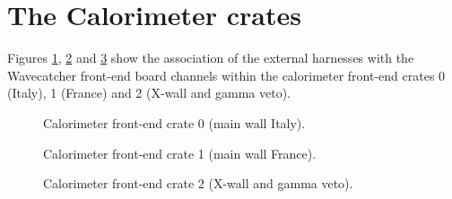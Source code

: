 
\clearpage
\section{The Calorimeter crates}

Figures  \ref{fig:calosignal:crates:0},  \ref{fig:calosignal:crates:1}
and \ref{fig:calosignal:crates:2} show the association of the external
harnesses  with the  Wavecatcher front-end  board channels  within the
calorimeter front-end crates  0 (Italy), 1 (France) and  2 (X-wall and
gamma veto).

\begin{figure}[h!]
  \begin{center}
    \scalebox{0.6}{}
  \end{center}
  \caption{Calorimeter front-end crate 0 (main wall Italy).}
  \label{fig:calosignal:crates:0}
\end{figure}

\begin{figure}[h!]
  \begin{center}
    \scalebox{0.6}{}
  \end{center}
  \caption{Calorimeter front-end crate 1 (main wall France).}
  \label{fig:calosignal:crates:1}
 
\end{figure}

\begin{figure}[h!]
  \begin{center}
    \scalebox{0.6}{}
  \end{center}
  \caption{Calorimeter front-end crate 2 (X-wall and gamma veto).}
  \label{fig:calosignal:crates:2}
 
\end{figure}
\clearpage

